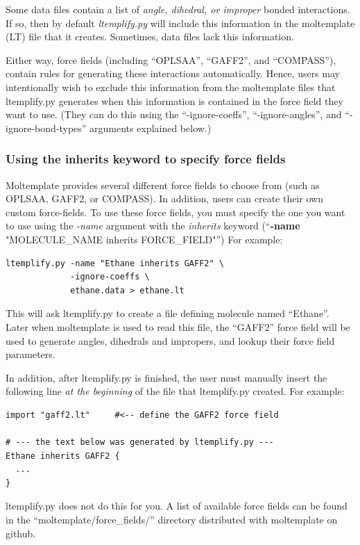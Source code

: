 \documentclass[11pt]{article}
\begin{document}
Some data files contain a list of \textit{angle, dihedral, or improper}
bonded interactions.  If so, then by default \textit{ltemplify.py}
will include this information in the moltemplate (LT) file that it creates.
Sometimes, data files lack this information.

Either way, force fields
(including ``OPLSAA'', ``GAFF2'', and ``COMPASS''),
contain rules for generating these interactions automatically.
Hence, users may intentionally wish to exclude this
information from the moltemplate files that ltemplify.py generates
when this information is contained in the force field they want to use.
(They can do this using the ``-ignore-coeffs'', ``-ignore-angles'',
 and ``-ignore-bond-types'' arguments explained below.)

\subsubsection*{ Using the inherits keyword to specify force fields}

Moltemplate provides several different force fields to choose from
(such as OPLSAA, GAFF2, or COMPASS).  In addition, users can create their own custom force-fields.
To use these force fields, you must specify the one you want to use
using the \textit{-name} argument with the \textit{inherits} keyword
(``\textbf{-name} "MOLECULE\_NAME inherits FORCE\_FIELD"'')
For example:
\begin{verbatim}
ltemplify.py -name "Ethane inherits GAFF2" \
             -ignore-coeffs \
             ethane.data > ethane.lt
\end{verbatim}
This will ask ltemplify.py to create a file defining
molecule named ``Ethane''.
Later when moltemplate is used to read this file, the ``GAFF2''
force field will be used to generate angles, dihedrals and impropers,
and lookup their force field parameters.

In addition, after ltemplify.py is finished, the user must manually insert the following line \textit{at the beginning} of the file that ltemplify.py created.  For example:
\begin{verbatim}
import "gaff2.lt"     #<-- define the GAFF2 force field

# --- the text below was generated by ltemplify.py ---
Ethane inherits GAFF2 {
  ...
}
\end{verbatim}
ltemplify.py does not do this for you.  A list of available force fields can be found in the ``moltemplate/force\_fields/'' directory distributed with moltemplate on github.
\end{document}
